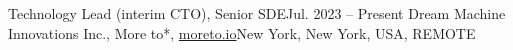 \resumeSubheading
{Technology Lead (interim CTO), Senior SDE}{Jul. 2023 -- Present}
{Dream Machine Innovations Inc., More to*, \href{https://moreto.io}{moreto.io}}{New York, New York, USA, REMOTE}
\resumeItemListStart
\resumeItemListEnd
